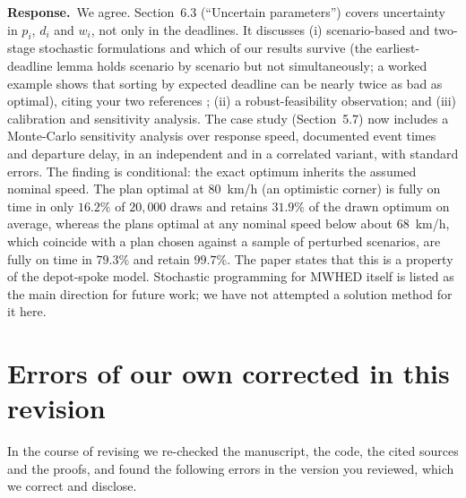 \documentclass[11pt]{article}
\newcommand{\reply}{\noindent\textbf{Response.}\ }
\begin{document}
\reply We agree. Section~6.3 (``Uncertain parameters'') covers
uncertainty in $p_i$, $d_i$ and $w_i$, not only in the deadlines. It
discusses (i) scenario-based and two-stage stochastic formulations and
which of our results survive (the earliest-deadline lemma holds scenario
by scenario but not simultaneously; a worked example shows that sorting
by expected deadline can be nearly twice as bad as optimal), citing your
two references \citep{wang2020evac,koca2023}; (ii) a robust-feasibility
observation; and (iii) calibration and sensitivity analysis. The case
study (Section~5.7) now includes a Monte-Carlo sensitivity analysis over
response speed, documented event times and departure delay, in an
independent and in a correlated variant, with standard errors. The
finding is conditional: the exact optimum inherits the assumed nominal
speed. The plan optimal at $80$~km/h (an optimistic corner) is fully on
time in only $16.2\%$ of $20{,}000$ draws and retains $31.9\%$ of the
drawn optimum on average, whereas the plans optimal at any nominal speed
below about $68$~km/h, which coincide with a plan chosen against a sample
of perturbed scenarios, are fully on time in $79.3\%$ and retain $99.7\%$.
The paper states that this is a property of the depot-spoke model. Stochastic programming
for MWHED itself is listed as the main direction for future work; we have
not attempted a solution method for it here.

\section{Errors of our own corrected in this revision}\label{sec:own}

In the course of revising we re-checked the manuscript, the code, the
cited sources and the proofs, and found the following errors in the
version you reviewed, which we correct and disclose.
\end{document}
